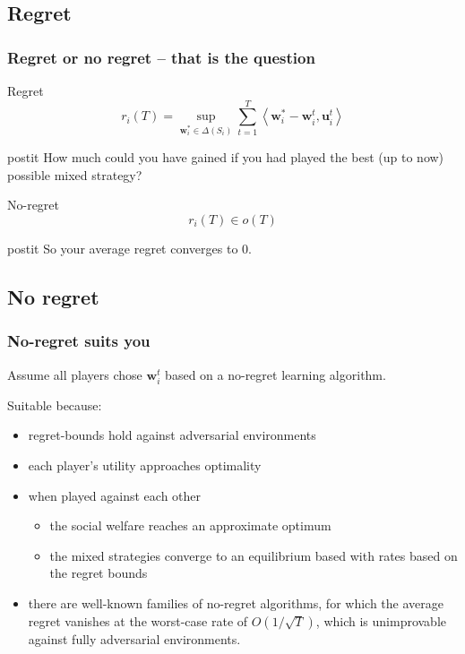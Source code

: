\documentclass{beamer}
\begin{document}
\subsection{Regret}

\begin{frame}
	\frametitle{Regret or no regret -- that is the question}
		\begin{block}{Regret}
			\begin{equation*}
			r_i(T) = \sup\limits_{\mathbf{w}^*_i \in \Delta (S_i)} \sum_{t=1}^{T} \left< \mathbf{w}^*_i - \mathbf{w}^t_i, \mathbf{u}^t_i \right>
			\end{equation*}\pause
			\begin{beamercolorbox}[sep=1em]{postit}
				How much could you have gained if you had played the best (up to now) possible mixed strategy? 
			\end{beamercolorbox}
		\end{block}
		\pause
				\begin{block}{No-regret}
					\begin{equation*}
					r_i(T) \in o(T)
					\end{equation*}\pause
					\begin{beamercolorbox}[sep=1em]{postit}
						So your average regret converges to 0.
					\end{beamercolorbox}
				\end{block}
\end{frame}


\subsection{No regret}
\begin{frame}
	\frametitle{No-regret suits you}
	Assume all players chose $\mathbf{w}^t_i$ based on a no-regret learning algorithm.
	
	Suitable because:
	\begin{itemize}
		\item regret-bounds hold against adversarial environments
		\item each player's utility approaches optimality
		\item when played against each other
		\begin{itemize}
			\item the social welfare reaches an approximate optimum
			\item the mixed strategies converge to an equilibrium based with rates based on the regret bounds
		\end{itemize} 
		\item there are well-known families of no-regret algorithms, for which the average regret vanishes at the worst-case rate of $O(1/\sqrt{T})$, which is unimprovable against fully adversarial environments.
	\end{itemize}
\end{frame}
\end{document}
